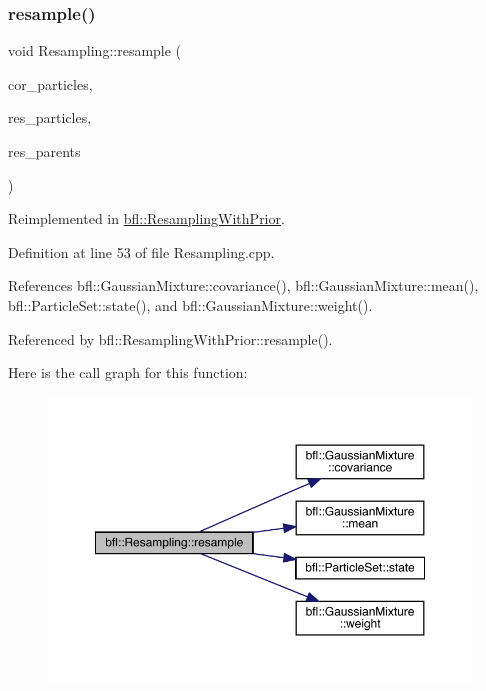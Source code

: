\mbox{\label{classbfl_1_1Resampling_a7527025ad8afc6dbae2225213571391c}} 
\subsubsection{\texorpdfstring{resample()}{resample()}}
{\footnotesize\ttfamily void Resampling\+::resample (\begin{DoxyParamCaption}\item[{const \mbox{\hyperlink{classbfl_1_1ParticleSet}{bfl\+::\+Particle\+Set}} \&}]{cor\+\_\+particles,  }\item[{\mbox{\hyperlink{classbfl_1_1ParticleSet}{bfl\+::\+Particle\+Set}} \&}]{res\+\_\+particles,  }\item[{Eigen\+::\+Ref$<$ Eigen\+::\+Vector\+Xi $>$}]{res\+\_\+parents }\end{DoxyParamCaption})\hspace{0.3cm}{\ttfamily [virtual]}}



Reimplemented in \mbox{\hyperlink{classbfl_1_1ResamplingWithPrior_adc830de19fe1294ea404ced91f0b05d6}{bfl\+::\+Resampling\+With\+Prior}}.



Definition at line 53 of file Resampling.\+cpp.



References bfl\+::\+Gaussian\+Mixture\+::covariance(), bfl\+::\+Gaussian\+Mixture\+::mean(), bfl\+::\+Particle\+Set\+::state(), and bfl\+::\+Gaussian\+Mixture\+::weight().



Referenced by bfl\+::\+Resampling\+With\+Prior\+::resample().

Here is the call graph for this function\+:
\nopagebreak
\begin{figure}[H]
\begin{center}
\leavevmode
\includegraphics[width=350pt]{classbfl_1_1Resampling_a7527025ad8afc6dbae2225213571391c_cgraph}
\end{center}
\end{figure}


